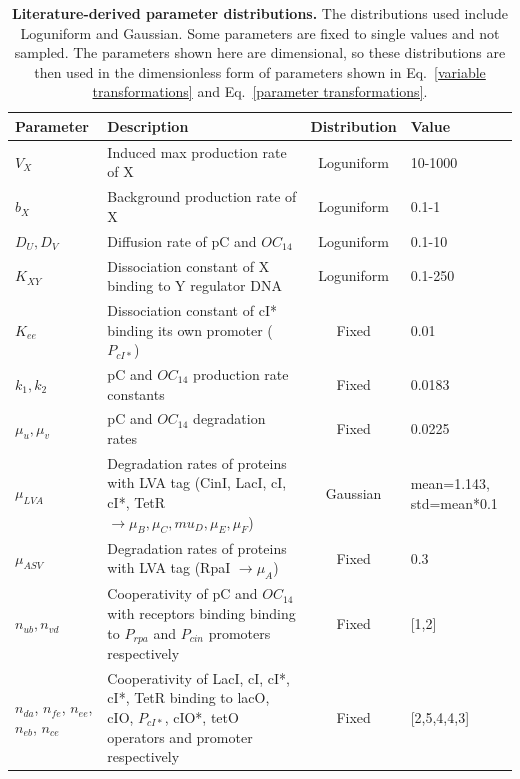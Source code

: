 \begin{table}[H]
    \caption{\textbf{Literature-derived parameter distributions.} The distributions used include Loguniform and Gaussian. Some parameters are fixed to single values and not sampled. The parameters shown here are dimensional, so these distributions are then used in the dimensionless form of parameters shown in Eq.~\ref{variable transformations} and Eq.~\ref{parameter transformations}.}
\label{tab:literature param distributions}
\renewcommand{\arraystretch}{1.3} %
\begin{tabular}{|p{20mm}|p{57mm}|c|p{25mm}|}
\hline
\textbf{Parameter} & \textbf{Description} & \textbf{Distribution} & \textbf{Value}\\
\hline

$V_{X}$ & Induced max production rate of X & Loguniform &  10-1000 \\
\hline
$b_{X}$ & Background production rate of X & Loguniform & 0.1-1\\
\hline
$D_{U}, D_{V}$ & Diffusion rate of pC and $OC_{14}$ & Loguniform & 0.1-10\\
\hline
$K_{XY}$ & Dissociation constant of X binding to Y regulator DNA & Loguniform & 0.1-250\\
\hline
$K_{ee}$ & Dissociation constant of cI* binding its own promoter ($P_{cI*}$) & Fixed & 0.01\\
\hline
$k_{1},k_{2}$ & pC and $OC_{14}$ production rate constants  & Fixed & 0.0183\\
\hline
$\mu_{u},\mu_{v}$ & pC and $OC_{14}$ degradation rates & Fixed & 0.0225\\
\hline
$\mu_{LVA}$ & Degradation rates of proteins with LVA tag (CinI, LacI, cI, cI*, TetR $\rightarrow \mu_{B}, \mu_{C}, mu_{D}, \mu_{E}, \mu_{F}$) & Gaussian & mean=1.143, std=mean*0.1\\
\hline
$\mu_{ASV}$ & Degradation rates of proteins with LVA tag (RpaI $\rightarrow \mu_{A}$) & Fixed & 0.3\\
\hline
$n_{ub}, n_{vd}$ & Cooperativity of pC and $OC_{14}$ with receptors binding binding to $P_{rpa}$ and $P_{cin}$ promoters respectively & Fixed & [1,2]\\
\hline
$n_{da}$, $n_{fe}$, $n_{ee}$, $n_{eb}$, $n_{ce}$ & Cooperativity of LacI, cI, cI*, cI*, TetR binding to lacO, cIO, $P_{cI*}$, cIO*, tetO operators and promoter respectively & Fixed & [2,5,4,4,3]\\
\hline
\end{tabular}
\end{table}

